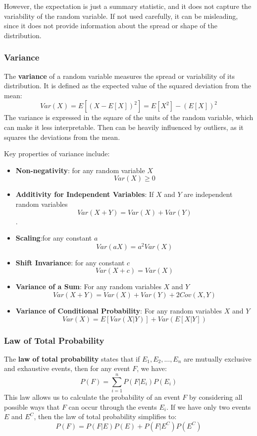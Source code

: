 However, the expectation is just a summary statistic, and it does not capture the variability of the random variable.
If not used carefully, it can be misleading, since it does not provide information about the spread or shape of the distribution.

\subsubsection{Variance}
The \textbf{variance} of a random variable measures the spread or variability of its distribution.
It is defined as the expected value of the squared deviation from the mean:
\begin{equation}
    Var(X) = E[(X - E[X])^2] = E[X^2] - (E[X])^2
\end{equation}
The variance is expressed in the square of the units of the random variable, which can make it less interpretable.
Then can be heavily influenced by outliers, as it squares the deviations from the mean.

Key properties of variance include:
\begin{itemize}
    \item \textbf{Non-negativity}: for any random variable $X$
        \[
            Var(X) \geq 0
        \]
    \item \textbf{Additivity for Independent Variables}: If $X$ and $Y$ are independent random variables
        \[
            Var(X + Y) = Var(X) + Var(Y)
        \].
    \item \textbf{Scaling}:for any constant $a$
        \[
            Var(aX) = a^2 Var(X)
        \]
    \item \textbf{Shift Invariance}: for any constant $c$
        \[
            Var(X + c) = Var(X)
        \]
    \item \textbf{Variance of a Sum}: For any random variables $X$ and $Y$
    \[
        Var(X + Y) = Var(X) + Var(Y) + 2Cov(X, Y)
    \]
    \item \textbf{Variance of Conditional Probability}: For any random variables $X$ and $Y$
    \[
        Var(X) = E[Var(X|Y)] + Var(E[X|Y])
    \]
\end{itemize}

\subsubsection{Law of Total Probability}
The \textbf{law of total probability} states that if $E_1, E_2, ..., E_n$ are mutually exclusive and exhaustive events, then for any event $F$, we have:
\begin{equation}
    P(F) = \sum_{i=1}^{n} P(F|E_i) P(E_i)
\end{equation}
This law allows us to calculate the probability of an event $F$ by considering all possible ways that $F$ can occur through the events $E_i$.
If we have only two events $E$ and $E^C$, then the law of total probability simplifies to:
\begin{equation}
    P(F) = P(F|E) P(E) + P(F|E^C) P(E^C)
\end{equation}

